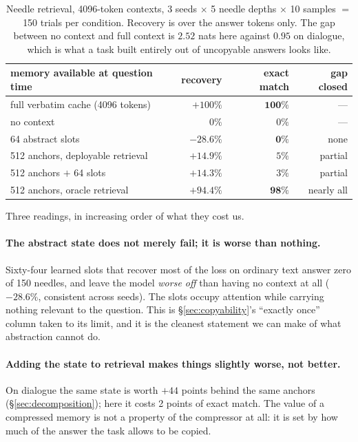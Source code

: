 \documentclass[11pt]{article}
\begin{document}
\begin{table}[ht]
\centering
\small
\begin{tabular}{lrrr}
\toprule
memory available at question time & recovery & exact match & gap closed \\
\midrule
full verbatim cache (4096 tokens)      & $+100\%$  & $\mathbf{100\%}$ & --- \\
no context                             & $0\%$     & $0\%$   & --- \\
\midrule
64 abstract slots                      & $\mathbf{-28.6\%}$ & $\mathbf{0\%}$ & none \\
512 anchors, deployable retrieval      & $+14.9\%$ & $5\%$   & partial \\
512 anchors $+$ 64 slots               & $+14.3\%$ & $3\%$   & partial \\
512 anchors, oracle retrieval          & $+94.4\%$ & $\mathbf{98\%}$ & nearly all \\
\bottomrule
\end{tabular}
\caption{Needle retrieval, 4096-token contexts, 3 seeds $\times$ 5 needle
depths $\times$ 10 samples $=$ 150 trials per condition. Recovery is over the
answer tokens only. The gap between no context and full context is $2.52$ nats
here against $0.95$ on dialogue, which is what a task built entirely out of
uncopyable answers looks like.}
\label{tab:needle}
\end{table}

Three readings, in increasing order of what they cost us.

\paragraph{The abstract state does not merely fail; it is worse than nothing.}
Sixty-four learned slots that recover most of the loss on ordinary text answer
zero of 150 needles, and leave the model \emph{worse off} than having no context
at all ($-28.6\%$, consistent across seeds). The slots occupy attention while
carrying nothing relevant to the question. This is \S\ref{sec:copyability}'s
``exactly once'' column taken to its limit, and it is the cleanest statement we
can make of what abstraction cannot do.

\paragraph{Adding the state to retrieval makes things slightly worse, not
better.} On dialogue the same state is worth $+44$ points behind the same
anchors (\S\ref{sec:decomposition}); here it costs 2 points of exact match. The
value of a compressed memory is not a property of the compressor at all: it is
set by how much of the answer the task allows to be copied.
\end{document}
